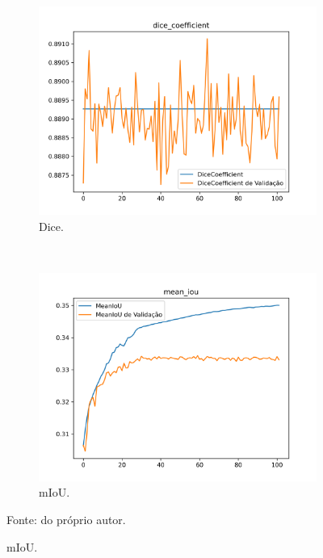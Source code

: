 \begin{figure}[H]
     \begin{subfigure}[t]{0.45\textwidth}
         \centering
         \includegraphics[width=1\linewidth]{recursos/imagens/results/bpca_unet500_miou_dice_coefficient.png}
         \caption{Dice.}
         \label{results:fig:semantic:metrics2.3}
     \end{subfigure}
     ~
     \begin{subfigure}[t]{0.45\textwidth}
         \centering
         \includegraphics[width=1\linewidth]{recursos/imagens/results/bpca_unet500_miou_mean_iou.png}
         \caption{mIoU.}
         \label{results:fig:semantic:metrics2.4}
     \end{subfigure}
     
     Fonte: do próprio autor.
\end{figure}

